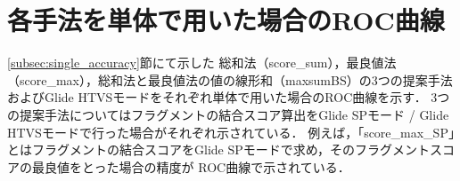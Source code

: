 \chapter{各手法を単体で用いた場合のROC曲線}\label{appendix:roc}
\ref{subsec:single_accuracy}節にて示した
総和法（score\_sum），最良値法（score\_max），総和法と最良値法の値の線形和（maxsumBS）の3つの提案手法
およびGlide HTVSモードをそれぞれ単体で用いた場合のROC曲線を示す．
3つの提案手法についてはフラグメントの結合スコア算出をGlide SPモード / Glide HTVSモードで行った場合がそれぞれ示されている．
例えば，「score\_max\_SP」とはフラグメントの結合スコアをGlide SPモードで求め，そのフラグメントスコアの最良値をとった場合の精度が
ROC曲線で示されている．

